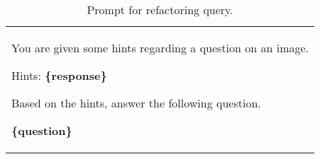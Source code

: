\begin{table*}[t]\centering
    \begin{minipage}{\textwidth}   
    \centering
        \begin{tcolorbox} 
            \centering
            \normalsize
            \begin{tabular}{p{}}
            {
            You are given some hints regarding a question on an image.
            
            Hints: \textbf{\{response\}}
            
            Based on the hints, answer the following question.
            
            \textbf{\{question\}}
            } %
            \end{tabular}
        \end{tcolorbox}
        \caption{Prompt for refactoring query.} 
        \label{tab:refactored query}
        \vspace{10pt}
    \end{minipage}
\end{table*} %